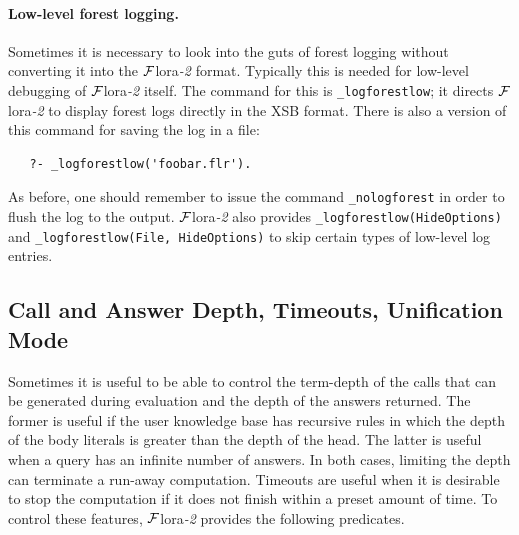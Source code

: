 \documentclass[11pt]{article}
\newcommand{\FLORA}{{\mbox{\sc ${\cal F}${lora}\rm\emph{-2}}}\xspace}
\begin{document}
\paragraph{Low-level forest logging.}
Sometimes it is necessary to look into the guts of forest logging without
converting it into the \FLORA format. Typically this is needed for
low-level debugging of \FLORA itself.
The command for this is
{\tt \_logforestlow}; it directs \FLORA to display forest logs 
directly in the XSB format.
There is also a version of this command for saving the log in a file:
\begin{verbatim}
   ?- _logforestlow('foobar.flr').
\end{verbatim}
As before, one should remember to issue the command \texttt{\_nologforest}
in order to flush the log to the output.
\FLORA also provides {\tt \_logforestlow(HideOptions)} and 
{\tt \_logforestlow(File, HideOptions)} to skip certain types of low-level 
log entries. 

\subsection{Call and Answer Depth, Timeouts, Unification
  Mode}\label{sec-timeout}

Sometimes it is useful to be able to control the term-depth of the calls
that can be generated during evaluation and the depth of the answers
returned. The former is useful if the user knowledge base has recursive
rules in which the depth of the body literals is greater than the depth of
the head. The latter is useful when a query has an infinite number of
answers. In both cases, limiting the depth can terminate a run-away
computation.
Timeouts are useful when it is desirable to stop the computation if it does
not finish within a preset amount of time.
To control these features, \FLORA provides the following predicates.
\end{document}
